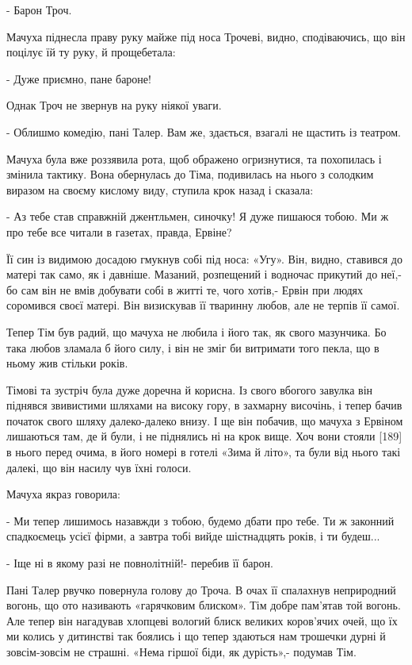 - Барон Троч.

Мачуха піднесла праву руку майже під носа Трочеві, видно, сподіваючись, що він поцілує їй ту руку, й прощебетала:

- Дуже приємно, пане бароне!

Однак Троч не звернув на руку ніякої уваги.

- Облишмо комедію, пані Талер. Вам же, здається, взагалі не щастить із театром.

Мачуха була вже роззявила рота, щоб ображено огризнутися, та похопилась і змінила тактику. Вона обернулась до Тіма, подивилась на нього з солодким виразом на своєму кислому виду, ступила крок назад і сказала:

- Аз тебе став справжній джентльмен, синочку! Я дуже пишаюся тобою. Ми ж про тебе все читали в газетах, правда, Ервіне?

Її син із видимою досадою гмукнув собі під носа: «Угу». Він, видно, ставився до матері так само, як і давніше. Мазаний, розпещений і водночас прикутий до неї,- бо сам він не вмів добувати собі в житті те, чого хотів,- Ервін при людях соромився своєї матері. Він визискував її тваринну любов, але не терпів її самої.

Тепер Тім був радий, що мачуха не любила і його так, як свого мазунчика. Бо така любов зламала б його силу, і він не зміг би витримати того пекла, що в ньому жив стільки років.

Тімові та зустріч була дуже доречна й корисна. Із свого вбогого завулка він піднявся звивистими шляхами на високу гору, в захмарну височінь, і тепер бачив початок свого шляху далеко-далеко внизу. І ще він побачив, що мачуха з Ервіном лишаються там, де й були, і не піднялись ні на крок вище. Хоч вони стояли [189] в нього перед очима, в його номері в готелі «Зима й літо», та були від нього такі далекі, що він насилу чув їхні голоси.

Мачуха якраз говорила:

- Ми тепер лишимось назавжди з тобою, будемо дбати про тебе. Ти ж законний спадкоємець усієї фірми, а завтра тобі вийде шістнадцять років, і ти будеш...

- Іще ні в якому разі не повнолітній!- перебив її барон.

Пані Талер рвучко повернула голову до Троча. В очах її спалахнув неприродний вогонь, що ото називають «гарячковим блиском». Тім добре пам'ятав той вогонь. Але тепер він нагадував хлопцеві вологий блиск великих коров'ячих очей, що їх ми колись у дитинстві так боялись і що тепер здаються нам трошечки дурні й зовсім-зовсім не страшні. «Нема гіршої біди, як дурість»,- подумав Тім.

